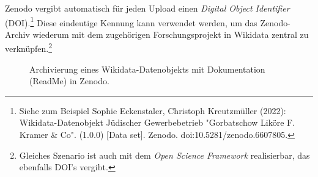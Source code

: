 Zenodo vergibt automatisch für jeden Upload einen \textit{Digital Object Identifier} (DOI).\footnote{Siehe zum Beispiel Sophie Eckenstaler, Christoph Kreutzmüller (2022): Wikidata-Datenobjekt Jüdischer Gewerbebetrieb "Gorbatschow Liköre F. Kramer \& Co". (1.0.0) [Data set]. Zenodo. doi:10.5281/zenodo.6607805.} Diese eindeutige Kennung kann verwendet werden, um das Zenodo-Archiv wiederum mit dem zugehörigen Forschungsprojekt in Wikidata zentral zu verknüpfen.\footnote{Gleiches Szenario ist auch mit dem \textit{Open Science Framework} realisierbar, das ebenfalls DOI's vergibt.}


\begin{figure}[h]
    \centering
    \caption[Archivierung in Zenodo]{Archivierung eines Wikidata-Datenobjekts mit Dokumentation (ReadMe) in Zenodo.}
    \label{fig:zenodo}
\end{figure}